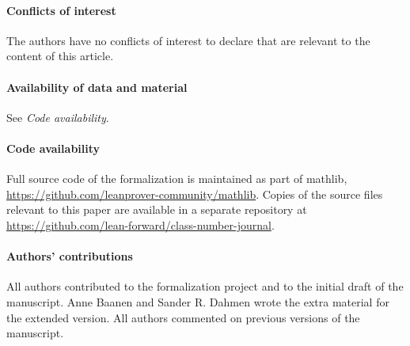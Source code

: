 \documentclass[sn-mathphys]{sn-jnl}%
\newcommand{\mathlib}{\textsf{mathlib}\xspace}
\begin{document}
\paragraph{Conflicts of interest}
The authors have no conflicts of interest to declare that are relevant to the content of this article.

\paragraph{Availability of data and material}
See \emph{Code availability}.

\paragraph{Code availability}
Full source code of the formalization is maintained as part of \mathlib, \url{https://github.com/leanprover-community/mathlib}. Copies of the source files relevant to this paper are available in a separate repository at \url{https://github.com/lean-forward/class-number-journal}.

\paragraph{Authors' contributions}
All authors contributed to the formalization project and to the initial draft of the manuscript.  Anne Baanen and Sander R. Dahmen wrote the extra material for the extended version. All authors commented on previous versions of the manuscript.


\end{document}
